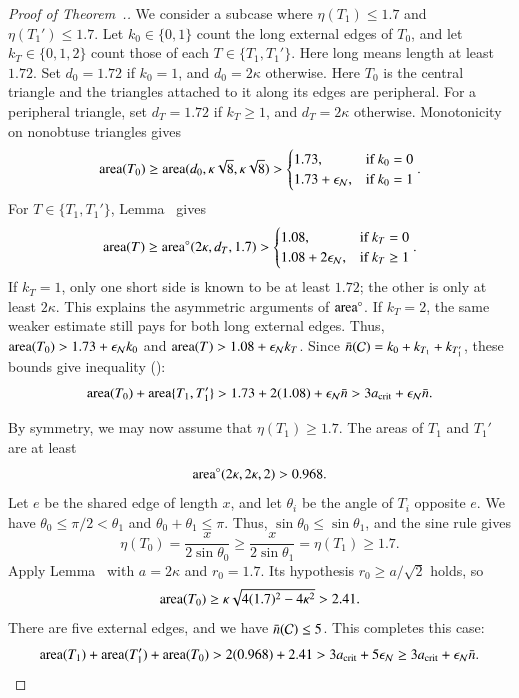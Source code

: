 \begin{proof}[Proof of Theorem~.]
We consider a subcase where $\eta(T_1)\le1.7$ and
$\eta(T_1')\le1.7$.  Let $k_0\in\{0,1\}$ count the long external
edges of $T_0$, and let $k_T\in\{0,1,2\}$ count those of each
$T\in\{T_1,T_1'\}$.  Here long means length at least $1.72$.
Set $d_0=1.72$ if $k_0=1$, and $d_0=2\kappa$ otherwise.
Here $T_0$ is the central triangle and the triangles attached to it
along its edges are peripheral. For a peripheral triangle, set $d_T=1.72$ if $k_T\ge1$, and
$d_T=2\kappa$ otherwise.  Monotonicity on nonobtuse triangles gives
\[
{\operatorname{area}}(T_0) \ge {\operatorname{area}}(d_0,\kappa\sqrt{8},\kappa\sqrt{8}) >
   \begin{cases}1.73,&\text{if } k_0=0\\
     1.73+\epsilon_{\mathcal N}, & \text{if } k_0=1 \end{cases}.
\]
For $T\in\{T_1,T_1'\}$,
Lemma~ gives
\begin{equation}\libel{eqn:173}
\area(T) \ge \areta(2\kappa,d_T,1.7) >
   \begin{cases}1.08,&\text{if } k_T=0\\
     1.08+2\epsN, & \text{if } k_T\ge1 \end{cases}.
\end{equation}
If $k_T=1$, only one short side is known to be at least $1.72$;
the other is only at least $2\kappa$.  This explains the asymmetric
arguments of ${\operatorname{area}}^\circ$.  If $k_T=2$, the same weaker estimate still
pays for both long external edges.  Thus,
${\operatorname{area}}(T_0)>1.73+\epsilon_{\mathcal N} k_0$ and
${\operatorname{area}}(T)>1.08+\epsilon_{\mathcal N} k_T$.  Since
$\bar n(\mathcal C)=k_0+k_{T_1}+k_{T_1'}$, these bounds give
inequality ():
\[
{\operatorname{area}}(T_0) +{\operatorname{area}}\{T_1,T_1'\}  > 1.73 + 2(1.08) + \epsilon_{\mathcal N} \bar n > 
3 a_\text{crit} +  \epsilon_{\mathcal N} \bar n.
\]

By symmetry, we may now assume that $\eta(T_1) \ge 1.7$.  
The areas of $T_1$ and $T_1'$ are at least
\begin{equation}\libel{eqn:968}
\areta(2\kappa,2\kappa,2) > 0.968.
\end{equation}
Let $e$ be the shared edge of length $x$, and let $\theta_i$ be the angle of
$T_i$ opposite $e$.  We have $\theta_0\le\pi/2<\theta_1$ and
$\theta_0+\theta_1\le\pi$.  Thus,
$\sin\theta_0\le\sin\theta_1$, and the sine rule gives
\[
\eta(T_0)=\frac{x}{2\sin\theta_0}
\ge\frac{x}{2\sin\theta_1}=\eta(T_1)\ge1.7.
\]
Apply Lemma~ with $a=2\kappa$
and $r_0=1.7$.  Its hypothesis $r_0\ge a/\sqrt2$ holds, so
\[
{\operatorname{area}}(T_0)\ge\kappa\sqrt{4(1.7)^2-4\kappa^2}>2.41.
\]
There are five external edges, and we have $\bar n(\mathcal C)\le 5$.
This completes this case:
\[
{\operatorname{area}}(T_1) + {\operatorname{area}}(T_1') + {\operatorname{area}}(T_0) 
>
2(0.968) + 2.41 > 3a_\text{crit} + 5 \epsilon_{\mathcal N} \ge 3a_\text{crit} + \epsilon_{\mathcal N} \bar n.
\] 


\end{proof}
